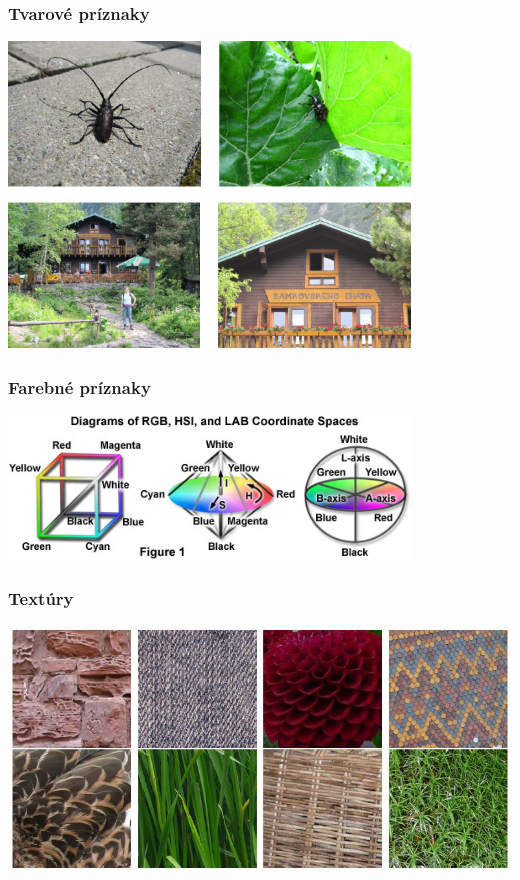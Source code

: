 \documentclass{beamer}
\begin{document}
\begin{frame}
\frametitle{Tvarové príznaky}
\centering
\includegraphics[width=0.8\textwidth]{instance.png}
\end{frame}

\begin{frame}
\frametitle{Farebné príznaky}
\centering
\includegraphics[width=0.8\textwidth]{colorspaces.jpg}
\end{frame}

\begin{frame}
\frametitle{Textúry}
\centering
\includegraphics[width=\textwidth]{textury1.png}
\end{frame}
\end{document}
